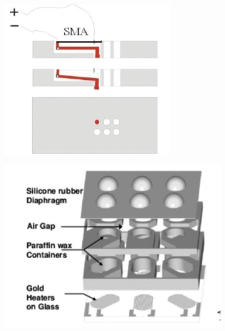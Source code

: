 \begin{figure}[h]
\centering
    \includegraphics[width=\textwidth]{figures/sma-mechanism.png}
\caption{}
\label{fig:sma-mechanism.png}
\end{figure}

\begin{figure}[h]
\centering
    \includegraphics[width=\textwidth]{figures/parafin.png}
\caption{}
\label{fig:parafin.png}
\end{figure}

